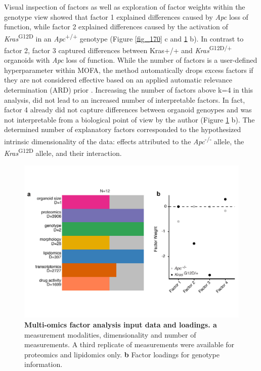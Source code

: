\begin{flushleft}
Visual inspection of factors as well as exploration of factor weights within the genotype view showed that factor 1 explained differences caused by \textit{Apc} loss of function, while factor 2 explained differences caused by the activation of \textit{Kras}\textsuperscript{G12D} in an \textit{Apc}\textsuperscript{+/+} genotype (Figure \ref{fig_170} c and \ref{fig_180} b). In contrast to factor 2, factor 3 captured differences between Kras+/+ and \textit{Kras}\textsuperscript{G12D/+} organoids with \textit{Apc} loss of function. While the number of factors is a user-defined hyperparameter within MOFA, the method automatically drops excess factors if they are not considered effective based on an applied automatic relevance determination (ARD) prior \citep{argelaguetMultiOmicsFactorAnalysis2018b}. Increasing the number of factors above k=4 in this analysis, did not lead to an increased number of interpretable factors. In fact, factor 4 already did not capture differences between organoid genoypes and was not interpretable from a biological point of view by the author (Figure \ref{fig_180} b). The determined number of explanatory factors corresponded to the hypothesized intrinsic dimensionality of the data: effects attributed to the \textit{Apc}\textsuperscript{-/-}  allele, the \textit{Kras}\textsuperscript{G12D} allele, and their interaction.

\begin{figure}[h!]
\centering
\includegraphics[width=400pt,
                height=\textheight,
                keepaspectratio]{figures/adenomaprofiling/pdf/fig_1_8.pdf}
\caption[Multi-omics factor analysis input data and loadings]{\textbf{Multi-omics factor analysis input data and loadings. a} measurement modalities, dimensionality and number of measurements. A third replicate of measurements were available for proteomics and lipidomics only. \textbf{b} Factor loadings for genotype information.} 
\label{fig_180}
\end{figure}
\bigbreak


\end{flushleft}
